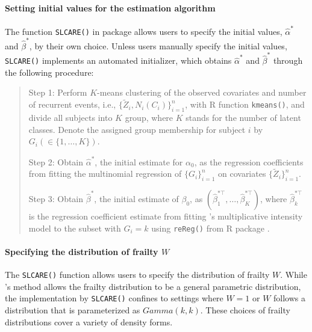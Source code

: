 \hypertarget{setting-initial-values-for-the-estimation-algorithm}{%
\paragraph{Setting initial values for the estimation algorithm}\label{setting-initial-values-for-the-estimation-algorithm}}

The function \texttt{SLCARE()} in package  allows users to specify the initial values, \(\hat\alpha^*\) and \(\hat\beta^*\), by their own choice. Unless users manually specify the initial values,
\texttt{SLCARE()} implements an automated initializer, which obtains \(\hat\alpha^*\) and \(\hat\beta^*\) through the following procedure:

\begin{quote}
Step 1: Perform \(K\)-means clustering \citep{lloyd1982least} of the observed covariates and number of recurrent events, i.e., \(\{\tilde Z_i, N_i(C_i)\}_{i=1}^n\), with R function \texttt{kmeans()}, and divide all subjects into \(K\) group, where \(K\) stands for the number of latent classes. Denote the assigned group membership for subject \(i\) by \(G_i (\in\{1,\ldots, K\})\).

Step 2: Obtain \(\hat\alpha^*\), the initial estimate for \(\alpha _0\), as the regression coefficients from fitting the
multinomial regression of \(\{G_i\}_{i=1}^n\) on covariates \(\{\tilde{Z}_i\}_{i=1}^n\).

Step 3: Obtain \(\hat\beta^*\), the initial estimate of \(\beta _0\), as \((\hat\beta_1^{*\top},\ldots, \hat\beta_K^{*\top})\), where \(\hat\beta_k^{*\top}\) is the regression coefficient estimate from fitting \citet{wang2001analyzing} 's multiplicative intensity model to the subset with \(G_i=k\) using \texttt{reReg()} from R package  \citep{reReg}.
\end{quote}

\hypertarget{specifying-the-distribution-of-frailty-w}{%
\paragraph{\texorpdfstring{Specifying the distribution of frailty \(W\)}{Specifying the distribution of frailty W}}\label{specifying-the-distribution-of-frailty-w}}

The \texttt{SLCARE()} function allows users to specify the distribution of frailty \(W\). While \citet{zhao2022semiparametric} 's method allows the frailty distribution to be a general parametric distribution, the implementation by \texttt{SLCARE()} confines to settings where \(W=1\) or \(W\) follows a distribution that is parameterized as \(Gamma(k, k)\). These choices of frailty distributions cover a variety of density forms.

